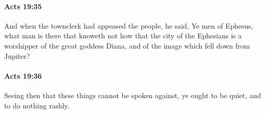 		\paragraph{Acts 19:35} %
			\label{ACTS-19-35}

			And when the townclerk had appeased the people, he said, Ye men of Ephesus, what man is there that knoweth not how that the city of the Ephesians is a worshipper of the great goddess Diana, and of the image which fell down from Jupiter?

			\begin{framed}
			\scriptsize
				\begin{compactdesc}
					\item[SBLG] 
				\end{compactdesc}
			\end{framed}

		\paragraph{Acts 19:36} %
			\label{ACTS-19-36}

			Seeing then that these things cannot be spoken against, ye ought to be quiet, and to do nothing rashly.

